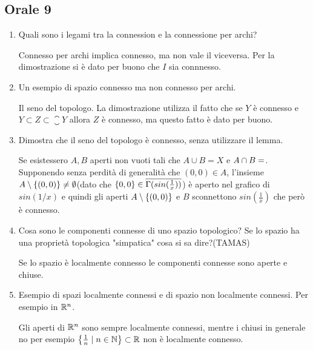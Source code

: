 \documentclass[]{article}
\begin{document}
\subsection{Orale 9}
\begin{enumerate}
    \item Quali sono i legami tra la connession e la connessione per archi?
    \begin{answer}
        Connesso per archi implica connesso, ma non vale il viceversa.
        Per la dimostrazione si \`e dato per buono che $I$ sia connnesso.
    \end{answer}
    \item Un esempio di spazio connesso ma non connesso per archi.
    \begin{answer}
        Il seno del topologo. La dimostrazione utilizza il fatto che se $Y$ \`e connesso
        e $Y \subset Z \subset \closure{Y}$ allora $Z$ \`e connesso, ma questo fatto \`e dato per buono.
    \end{answer}
    \item Dimostra che il seno del topologo \`e connesso, senza utilizzare il lemma.
    \begin{answer}
        Se esistessero $A,B$ aperti non vuoti tali che $A \cup B = X$ e $A \cap B = \empty$. Supponendo senza perdit\`a
        di generalit\`a che $(0,0) \in A$, l'insieme $A \setminus \left\{ (0,0) \right\} \neq \emptyset$(dato che $\left\{ 0,0 \right\} \in \overline{\Gamma(sin(\frac{1}{x}))} $) \`e aperto nel grafico di $sin\left(1/x\right)$
        e quindi gli aperti $A \setminus \left\{ (0,0) \right\}$ e $B$ sconnettono $sin\left(\frac{1}{x}\right)$ che per\`o \`e connesso.
    \end{answer} 
    \item Cosa sono le componenti connesse di uno spazio topologico? Se lo spazio ha una propriet\`a topologica "simpatica" cosa si sa dire?(TAMAS)
    \begin{answer}
        Se lo spazio \`e localmente connesso le componenti connesse sono aperte e chiuse.
    \end{answer}
    \item Esempio di spazi localmente connessi e di spazio non localmente connessi. Per esempio in $\mathbb{R}^n$.
    \begin{answer}
        Gli aperti di $\mathbb{R}^n$ sono sempre localmente connessi, mentre i chiusi in generale no per esempio $\left\{ \frac{1}{n} \mid n \in \mathbb{N} \right\} \subset \mathbb{R}$ non \`e localmente connesso.
    \end{answer}
\end{enumerate}

    
\end{document}
